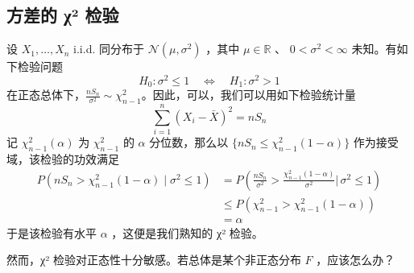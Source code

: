 \subsection{方差的 χ² 检验}

\begin{example}[方差的 χ² 检验]
设 $X_1,\dots,X_n$ i.i.d. 同分布于 $\mathcal{N}(\mu,\sigma^2)$ ，其中 $\mu\in\mathbb R$ 、 $0<\sigma^2<\infty$ 未知。有如下检验问题
\[H_0:\sigma^2\le 1 \quad \iff\quad H_1:\sigma^2>1\]
在正态总体下，$\frac{nS_n}{\sigma^2}\sim\chi_{n-1}^2$。因此，可以，我们可以用如下检验统计量
\[\sum_{i=1}^n(X_i-\bar{X})^2=nS_n\]
记 $\chi^2_{n-1}(\alpha)$ 为 $\chi^2_{n-1}$ 的 $\alpha$ 分位数，那么以 $\{nS_n\le \chi^2_{n-1}(1-\alpha)\}$ 作为接受域，该检验的功效满足
\[\begin{aligned} P(nS_n>\chi^2_{n-1}(1-\alpha)\mid \sigma^2\le 1)&=P\left(\frac{nS_n}{\sigma^2}>\frac{\chi^2_{n-1}(1-\alpha)}{\sigma^2}\Big|\,\sigma^2\le 1\right)\\ &\le P(\chi^2_{n-1}>\chi^2_{n-1}(1-\alpha))\\ &=\alpha \end{aligned}\]
于是该检验有水平 $\alpha$ ，这便是我们熟知的 χ² 检验。

然而，χ² 检验对正态性十分敏感。若总体是某个非正态分布 $F$ ，应该怎么办？

\end{example}


